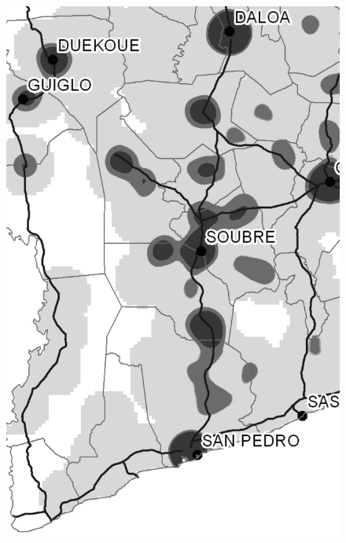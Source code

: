\begin{figure}[h!]
{    \includegraphics[scale = 0.1]{results/images/kernel/l_hour7_kd_detail.pdf}
	\label{fig:subfig2_detail}
}
\subfigure[Monday, 08:00]{
}
\end{figure}
